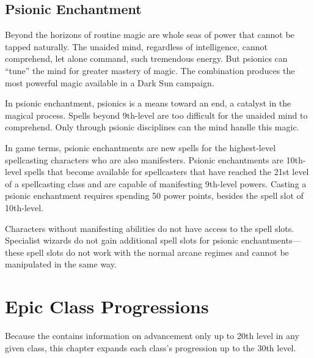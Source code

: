 

\subsection{Psionic Enchantment}
Beyond the horizons of routine magic are whole seas of power that cannot be tapped naturally. The unaided mind, regardless of intelligence, cannot comprehend, let alone command, such tremendous energy. But psionics can ``tune'' the mind for greater mastery of magic. The combination produces the most powerful magic available in a {\tableheader Dark Sun} campaign.

In psionic enchantment, psionics is a means toward an end, a catalyst in the magical process. Spells beyond 9th-level are too difficult for the unaided mind to comprehend. Only through psionic disciplines can the mind handle this magic.

In game terms, psionic enchantments are new spells for the highest-level spellcasting characters who are also manifesters. Psionic enchantments are 10th-level spells that become available for spellcasters that have reached the 21st level of a spellcasting class and are capable of manifesting 9th-level powers. Casting a psionic enchantment requires spending 50 power points, besides the spell slot of 10th-level.

Characters without manifesting abilities do not have access to the spell slots. Specialist wizards do not gain additional spell slots for psionic enchantments---these spell slots do not work with the normal arcane regimes and cannot be manipulated in the same way.

\section{Epic Class Progressions}
Because the  contains information on advancement only up to 20th level in any given class, this chapter expands each class's progression up to the 30th level.











